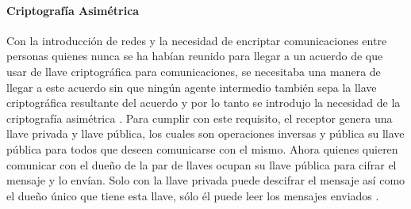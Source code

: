 \paragraph{Criptografía Asimétrica}
Con la introducción de redes y la necesidad de encriptar comunicaciones entre personas quienes nunca se ha habían reunido para llegar a un acuerdo de que usar de llave criptográfica para comunicaciones, se necesitaba una manera de llegar a este acuerdo sin que ningún agente intermedio también sepa la llave criptográfica resultante del acuerdo y por lo tanto se introdujo la necesidad de la criptografía asimétrica \citep{Khanacademy-RSA-1}. Para cumplir con este requisito, el receptor genera una llave privada y llave pública, los cuales son operaciones inversas y pública su llave pública para todos que deseen comunicarse con el mismo. Ahora quienes quieren comunicar con el dueño de la par de llaves ocupan su llave pública para cifrar el mensaje y lo envían. Solo con la llave privada puede descifrar el mensaje así como el dueño único que tiene esta llave, sólo él puede leer los mensajes enviados \citep{Khanacademy-RSA-1}.

